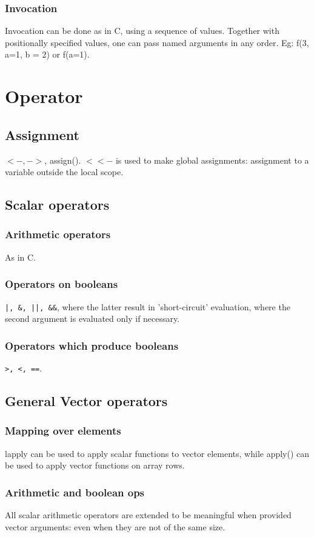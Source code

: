 \documentclass[oneside, article]{memoir}
\begin{document}
\subsubsection{Invocation}
Invocation can be done as in C, using a sequence of values. Together with positionally specified values, one can pass named arguments in any order. Eg: f(3, a=1, b = 2) or f(a=1).

\section{Operator}
\subsection{Assignment}
$<-, ->$, assign(). $<<-$ is used to make global assignments: assignment to a variable outside the local scope.

\subsection{Scalar operators}
\subsubsection{Arithmetic operators}
As in C.

\subsubsection{Operators on booleans}
\verb'|, &, ||, &&',  where the latter result in 'short-circuit' evaluation, where the second argument is evaluated only if necessary.

\subsubsection{Operators which produce booleans}
\verb'>, <, =='.

\subsection{General Vector operators}
\subsubsection{Mapping over elements}
lapply can be used to apply scalar functions to vector elements, while apply() can be used to apply vector functions on array rows.

\subsubsection{Arithmetic and boolean ops}
All scalar arithmetic operators are extended to be meaningful when provided vector arguments: even when they are not of the same size.
\end{document}

